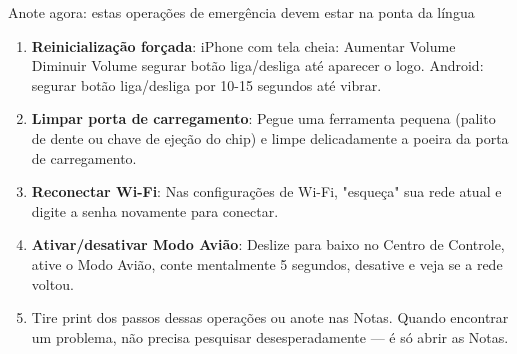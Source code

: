 \begin{tcbpractice}{Anote agora: estas operações de emergência devem estar na ponta da língua}
\begin{enumerate}
  \item \textbf{Reinicialização forçada}: iPhone com tela cheia: Aumentar Volume Diminuir Volume segurar botão liga/desliga até aparecer o logo. Android: segurar botão liga/desliga por 10-15 segundos até vibrar.
  \item \textbf{Limpar porta de carregamento}: Pegue uma ferramenta pequena (palito de dente ou chave de ejeção do chip) e limpe delicadamente a poeira da porta de carregamento.
  \item \textbf{Reconectar Wi-Fi}: Nas configurações de Wi-Fi, "esqueça" sua rede atual e digite a senha novamente para conectar.
  \item \textbf{Ativar/desativar Modo Avião}: Deslize para baixo no Centro de Controle, ative o Modo Avião, conte mentalmente 5 segundos, desative e veja se a rede voltou.
  \item Tire print dos passos dessas operações ou anote nas Notas. Quando encontrar um problema, não precisa pesquisar desesperadamente — é só abrir as Notas.
\end{enumerate}

\end{tcbpractice}
